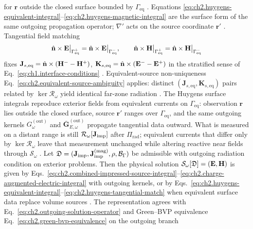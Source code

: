 for \(\mathbf{r}\) outside the closed surface bounded by \(\Gamma_{\mathrm{eq}}\)
\cite{stratton1941}. Equations
\eqref{eq:ch2.huygens-equivalent-integral}--\eqref{eq:ch2.huygens-magnetic-integral} are
the surface form of the same outgoing propagation operator;
\(\nabla'\) acts on the source coordinate \(\mathbf{r}'\) \cite{stratton1941}. Tangential
field matching
\begin{equation}
\label{eq:ch2.huygens-tangential-match}
\hat{\mathbf{n}}\times\mathbf{E}\big|_{\Gamma_{\mathrm{eq}}^{+}}
=
\hat{\mathbf{n}}\times\mathbf{E}\big|_{\Gamma_{\mathrm{eq}}^{-}},
\qquad
\hat{\mathbf{n}}\times\mathbf{H}\big|_{\Gamma_{\mathrm{eq}}^{+}}
=
\hat{\mathbf{n}}\times\mathbf{H}\big|_{\Gamma_{\mathrm{eq}}^{-}}
\end{equation}
fixes \(\mathbf{J}_{s,\mathrm{eq}}=\hat{\mathbf{n}}\times(\mathbf{H}^{-}-\mathbf{H}^{+})\),
\(\mathbf{K}_{s,\mathrm{eq}}=\hat{\mathbf{n}}\times(\mathbf{E}^{-}-\mathbf{E}^{+})\) in the stratified
sense of Eq.~\eqref{eq:ch1.interface-conditions} \cite{stratton1941}.
Equivalent-source non-uniqueness Eq.~\eqref{eq:ch2.equivalent-source-ambiguity} applies:
distinct \((\mathbf{J}_{s,\mathrm{eq}},\mathbf{K}_{s,\mathrm{eq}})\) pairs related by
\(\ker\mathcal{R}_\omega\) yield identical far-zone radiation \cite{harrington2001}. The
Huygens surface integrals reproduce exterior fields from equivalent currents on
$\Gamma_{\mathrm{eq}}$: observation $\mathbf{r}$ lies outside the closed surface, source
$\mathbf{r}'$ ranges over $\Gamma_{\mathrm{eq}}$, and the same outgoing kernels
$G_\omega^{\mathrm{(out)}}$ and $\overline{\mathbf{G}}_{E,\omega}^{\mathrm{(out)}}$ propagate
tangential data outward. What is measured on a distant range is still
$\mathcal{R}_\omega[\mathbf{J}_{\mathrm{imp}}]$ after $\Pi_{\mathrm{rad}}$; equivalent currents that differ only by
$\ker\mathcal{R}_\omega$ leave that measurement unchanged while altering reactive near fields
through $\mathcal{S}_\omega$ \cite{stratton1941}.
\label{thm:ch2.source-to-field-integral}
Let \(\mathfrak{D}=(\mathbf{J}_{\mathrm{imp}},\mathbf{J}^{\mathrm{(mag)}}_{\mathrm{imp}},\rho,\mathcal{B}_\Gamma)\)
be admissible with outgoing radiation condition on exterior problems. Then the physical solution
\(\mathcal{S}_\omega[\mathfrak{D}]=(\mathbf{E},\mathbf{H})\) is given by
Eqs.~\eqref{eq:ch2.combined-impressed-source-integral}--\eqref{eq:ch2.charge-augmented-electric-integral}
with outgoing kernels, or by Eqs.~\eqref{eq:ch2.huygens-equivalent-integral}--\eqref{eq:ch2.huygens-tangential-match}
when equivalent surface data replace volume sources \cite{stratton1941}.
The representation agrees with Eq.~\eqref{eq:ch2.outgoing-solution-operator} and
Green--BVP equivalence Eq.~\eqref{eq:ch2.green-bvp-equivalence} on the outgoing branch
